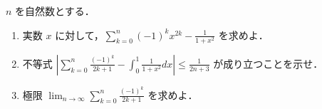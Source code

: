 \documentclass[a4paper,10pt]{ltjsarticle}
\begin{document}
\begin{oframed}
  $n$ を自然数とする．

  \begin{enumerate}
    \item
          実数 $x$ に対して，$\displaystyle \sum_{k=0}^{n} (-1)^k x^{2k} - \frac{1}{1+x^2}$ を求めよ．

    \item
          不等式 $\displaystyle \left| \sum_{k=0}^{n} \frac{(-1)^k}{2k+1} - \int_0^1 \frac{1}{1+x^2} dx \right| \leq \frac{1}{2n+3}$ が成り立つことを示せ．

    \item
          極限 $\displaystyle \lim_{n \to \infty} \sum_{k=0}^{n} \frac{(-1)^k}{2k+1}$ を求めよ．
  \end{enumerate}
\end{oframed}
\setlength{\columnseprule}{0.4pt}
\end{document}
